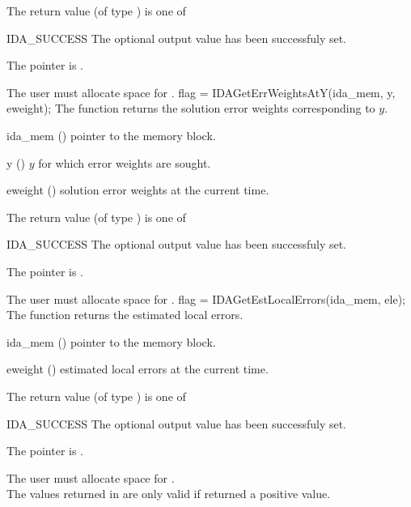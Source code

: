 {
  The return value  (of type ) is one of
  \begin{args}
  \item[IDA\_SUCCESS] 
    The optional output value has been successfuly set.
  \item[\Id{IDA\_MEM\_NULL}]
    The  pointer is .
  \end{args}
}
{
  {\warn} The user must allocate space for .
}
{
  flag = IDAGetErrWeightsAtY(ida\_mem, y, eweight);
}
{
  The function  returns the solution error weights 
  corresponding to $y$.
}
{
  \begin{args}[eweight]
  \item[ida\_mem] ()
    pointer to the {\ida} memory block.
  \item[y] ()
    $y$ for which error weights are sought.
  \item[eweight] ()
    solution error weights at the current time.
  \end{args}
}
{
  The return value  (of type ) is one of
  \begin{args}
  \item[IDA\_SUCCESS] 
    The optional output value has been successfuly set.
  \item[\Id{IDA\_MEM\_NULL}]
    The  pointer is .
  \end{args}
}
{
  {\warn} The user must allocate space for .
}
{
  flag = IDAGetEstLocalErrors(ida\_mem, ele);
}
{
  The function  returns the estimated local errors.
}
{
  \begin{args}
  \item[ida\_mem] ()
    pointer to the {\ida} memory block.
  \item[eweight] ()
    estimated local errors at the current time.
  \end{args}
}
{
  The return value  (of type ) is one of
  \begin{args}
  \item[IDA\_SUCCESS] 
    The optional output value has been successfuly set.
  \item[\Id{IDA\_MEM\_NULL}]
    The  pointer is .
  \end{args}
}
{
  {\warn} The user must allocate space for . \\
  {\warn} The values returned in  are only valid if
   returned a positive value.
}
